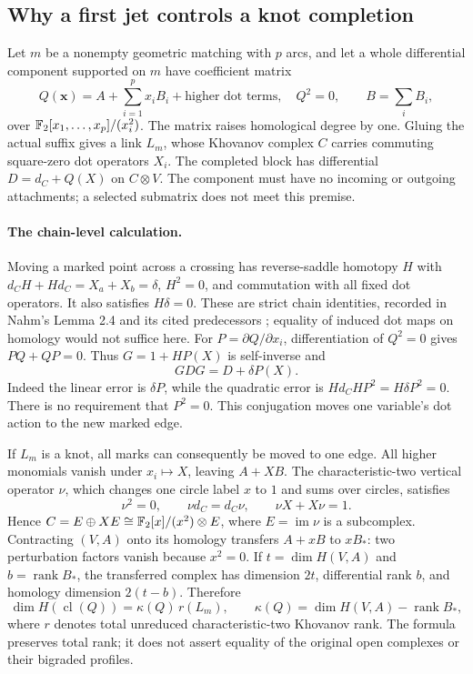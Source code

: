 \subsection{Why a first jet controls a knot completion}

Let $m$ be a nonempty geometric matching with $p$ arcs, and let a whole
differential component supported on $m$ have coefficient matrix
\[
 Q(\boldsymbol{x})=A+\sum_{i=1}^p x_iB_i+\text{higher dot terms},
 \quad Q^2=0,\qquad B=\sum_iB_i,
\]
over $\mathbb{F}_2[x_1,\ldots,x_p]/(x_i^2)$.  The matrix raises homological degree
by one.  Gluing the actual suffix gives a link $L_m$, whose Khovanov
complex $C$ carries commuting square-zero dot operators $X_i$.  The
completed block has differential $D=d_C+Q(X)$ on $C\otimes V$.
The component must have no incoming or outgoing attachments; a selected
submatrix does not meet this premise.

\paragraph{The chain-level calculation.}
Moving a marked point across a crossing has reverse-saddle homotopy $H$
with $d_CH+Hd_C=X_a+X_b=\delta$, $H^2=0$, and commutation with all
fixed dot operators.  It also satisfies $H\delta=0$.  These are strict
chain identities, recorded in Nahm's Lemma 2.4 and its cited predecessors
\cite{nahm-basepoints}; equality of induced dot maps on homology would
not suffice here.  For $P=\partial Q/\partial x_i$, differentiation of
$Q^2=0$ gives $PQ+QP=0$.  Thus $G=1+HP(X)$ is self-inverse and
\[
 GDG=D+\delta P(X).
\]
Indeed the linear error is $\delta P$, while the quadratic error is
$Hd_CHP^2=H\delta P^2=0$.  There is no requirement that $P^2=0$.
This conjugation moves one variable's dot action to the new marked edge.

If $L_m$ is a knot, all marks can consequently be moved to one edge.
All higher monomials vanish under $x_i\mapsto X$, leaving $A+XB$.
The characteristic-two vertical operator $\nu$, which changes one circle
label $x$ to $1$ and sums over circles, satisfies
\[
 \nu^2=0,\qquad \nu d_C=d_C\nu,\qquad \nu X+X\nu=1.
\]
Hence $C=E\oplus XE\cong\mathbb{F}_2[x]/(x^2)\otimes E$, where
$E=\operatorname{im}\nu$ is a subcomplex.  Contracting $(V,A)$ onto
its homology transfers $A+xB$ to $xB_*$: two perturbation factors vanish
because $x^2=0$.  If $t=\dim H(V,A)$ and $b=\operatorname{rank} B_*$,
the transferred complex has dimension $2t$, differential rank $b$,
and homology dimension $2(t-b)$.  Therefore
\[
 \dim H(\operatorname{cl}(Q))
   =\kappa(Q)\,r(L_m),\qquad
 \kappa(Q)=\dim H(V,A)-\operatorname{rank} B_*,
\]
where $r$ denotes total unreduced characteristic-two Khovanov rank.
The formula preserves total rank; it does not assert equality of the
original open complexes or their bigraded profiles.

